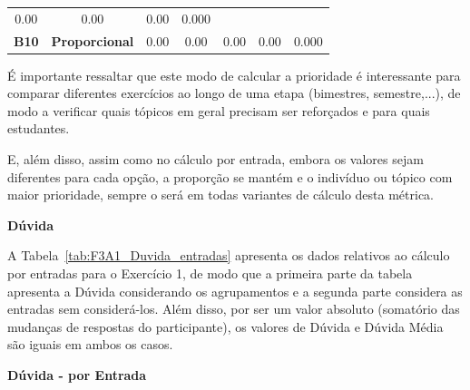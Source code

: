 \begin{table}[htbp]
\begin{tabular}{|c|cccccc|}
		\multicolumn{1}{c|}{0.00} &
		\multicolumn{1}{c|}{0.00} &
		\multicolumn{1}{c|}{0.00} &
		0.000 \\ \cline{2-7} 
		\multirow{-2}{*}{\textbf{B10}} &
		\multicolumn{1}{l|}{\cellcolor[HTML]{F2F2F2}\textbf{Proporcional}} &
		\multicolumn{1}{c|}{\cellcolor[HTML]{F2F2F2}0.00} &
		\multicolumn{1}{c|}{\cellcolor[HTML]{F2F2F2}0.00} &
		\multicolumn{1}{c|}{\cellcolor[HTML]{F2F2F2}0.00} &
		\multicolumn{1}{c|}{\cellcolor[HTML]{F2F2F2}0.00} &
		\cellcolor[HTML]{F2F2F2}0.000 \\ \hline
	\end{tabular}
	\label{tab:F3_P_casos_comagrupamento}
\end{table}

É importante ressaltar que este modo de calcular a prioridade é interessante para comparar diferentes exercícios ao longo de uma etapa (bimestres, semestre,...), de modo a verificar quais tópicos em geral precisam ser reforçados e para quais estudantes.

E, além disso, assim como no cálculo por entrada, embora os valores sejam diferentes para cada opção, a proporção se mantém e o indivíduo ou tópico com maior prioridade, sempre o será em todas variantes de cálculo desta métrica.


\textbf{Dúvida}

A Tabela~\ref{tab:F3A1_Duvida_entradas} apresenta os dados relativos ao cálculo por entradas para o Exercício 1, de modo que a primeira parte da tabela apresenta a Dúvida considerando os agrupamentos e a segunda parte considera as entradas sem considerá-los. Além disso, por ser um valor absoluto (somatório das mudanças de respostas do participante), os valores de Dúvida e Dúvida Média são iguais em ambos os casos.

\textbf{Dúvida - por Entrada}

